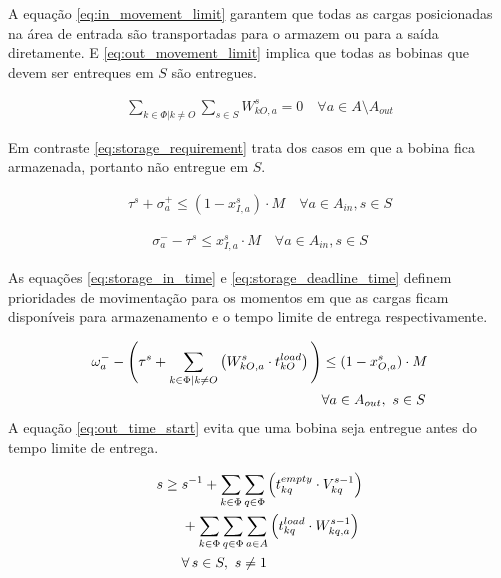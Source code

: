 \documentclass[journal]{IEEEtran}
\begin{document}
        A equação \ref{eq:in_movement_limit} 
        garantem que todas as cargas posicionadas na área de entrada são transportadas
        para o armazem ou para a saída diretamente. E  \ref{eq:out_movement_limit} 
        implica que todas as bobinas que devem ser entreques em $S$ são entregues.


        \begin{align}
            \sum_{k \in \Phi | k \neq O} \sum_{s \in S} W^s_{kO,a} = 0 \quad \forall a \in A \setminus A_{out} 
            \label{eq:storage_requirement}
        \end{align}

        Em contraste \ref{eq:storage_requirement} trata dos casos em que a bobina fica armazenada, portanto não
        entregue em $S$.
        
        

        \begin{align}
        \tau^s + \sigma^+_a \leq (1 - x^s_{I,a}) \cdot M \quad \forall a \in A_{in}, s \in S 
            \label{eq:storage_in_time}
        \end{align}
        
        \begin{align}
             \sigma^-_a - \tau^s \leq x^s_{I,a} \cdot M \quad \forall a \in A_{in}, s \in S 
            \label{eq:storage_deadline_time}
        \end{align}
        
        As equações \ref{eq:storage_in_time} e \ref{eq:storage_deadline_time} definem
        prioridades de movimentação para os momentos em que as cargas ficam disponíveis
        para armazenamento e o tempo limite de entrega respectivamente.

        \begin{align}
            \omega_a^- - \Bigg( \tau^s + 
            \sum_{k \in \Phi \mid k \neq O} \left( W^s_{kO,a} \cdot t^{load}_{kO} \right) 
            \Bigg) 
            &\leq (1 - x^s_{O,a}) \cdot M \notag \\
            &\forall a \in A_{out},\ s \in S 
            \label{eq:out_time_start}
        \end{align}
        A equação \ref{eq:out_time_start} evita que uma bobina seja entregue antes
        do tempo limite de entrega.

        \begin{align}
            s \geq\; & s^{-1} 
            + \sum_{k \in \Phi} \sum_{q \in \Phi} \left( t^{empty}_{kq} \cdot V^{s-1}_{kq} \right) \notag \\
            & + \sum_{k \in \Phi} \sum_{q \in \Phi} \sum_{a \in A} \left( t^{load}_{kq} \cdot W^{s-1}_{kq,a} \right) \notag \\
            & \forall\, s \in S,\ s \neq 1 \label{eq:time_progression}
        \end{align}
\end{document}
